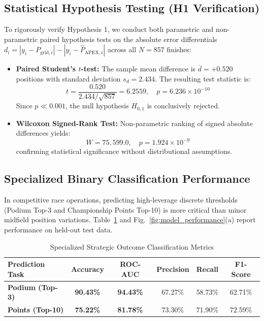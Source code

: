 \documentclass[journal]{IEEEtran}
\begin{document}
\subsection{Statistical Hypothesis Testing (H1 Verification)}
To rigorously verify Hypothesis 1, we conduct both parametric and non-parametric paired hypothesis tests on the absolute error differentials $d_i = |y_i - P_{\text{grid}, i}| - |y_i - \hat{P}_{\text{APEX}, i}|$ across all $N = 857$ finishes:
\begin{itemize}
    \item \textbf{Paired Student's $t$-test:} The sample mean difference is $\bar{d} = +0.520$ positions with standard deviation $s_d = 2.434$. The resulting test statistic is:
    \begin{equation}
    t = \frac{0.520}{2.434 / \sqrt{857}} = 6.2559, \quad p = 6.236 \times 10^{-10}
    \end{equation}
    Since $p \ll 0.001$, the null hypothesis $H_{0,1}$ is conclusively rejected.
    \item \textbf{Wilcoxon Signed-Rank Test:} Non-parametric ranking of signed absolute differences yields:
    \begin{equation}
    W = 75,599.0, \quad p = 1.924 \times 10^{-9}
    \end{equation}
    confirming statistical significance without distributional assumptions.
\end{itemize}

\subsection{Specialized Binary Classification Performance}
In competitive race operations, predicting high-leverage discrete thresholds (Podium Top-3 and Championship Points Top-10) is more critical than minor midfield position variations. Table~\ref{tab:classification_results} and Fig.~\ref{fig:model_performance}(a) report performance on held-out test data.

\begin{table}[!htbp]
\centering
\caption{Specialized Strategic Outcome Classification Metrics}
\label{tab:classification_results}
\begin{tabular}{lccccc}
\toprule
\textbf{Prediction Task} & \textbf{Accuracy} & \textbf{ROC-AUC} & \textbf{Precision} & \textbf{Recall} & \textbf{F1-Score} \\
\midrule
\textbf{Podium (Top-3)} & \textbf{90.43\%} & \textbf{94.43\%} & 67.27\% & 58.73\% & 62.71\% \\
\textbf{Points (Top-10)} & \textbf{75.22\%} & \textbf{81.78\%} & 73.30\% & 71.90\% & 72.59\% \\
\bottomrule
\end{tabular}
\end{table}
\end{document}
